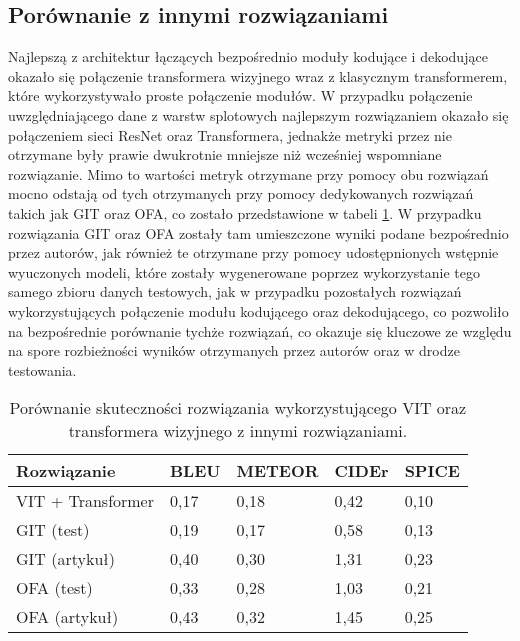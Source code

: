 \subsection{Porównanie z innymi rozwiązaniami}
Najlepszą z architektur łączących bezpośrednio moduły kodujące i dekodujące okazało się połączenie transformera wizyjnego wraz z klasycznym transformerem, które wykorzystywało proste połączenie modułów. W przypadku połączenie uwzględniającego dane z warstw splotowych najlepszym rozwiązaniem okazało się połączeniem sieci ResNet oraz Transformera, jednakże metryki przez nie otrzymane były prawie dwukrotnie mniejsze niż wcześniej wspomniane rozwiązanie. Mimo to wartości metryk otrzymane przy pomocy obu rozwiązań mocno odstają od tych otrzymanych przy pomocy dedykowanych rozwiązań takich jak GIT oraz OFA, co zostało przedstawione w tabeli \ref{tab:comparison}. W przypadku rozwiązania GIT oraz OFA zostały tam umieszczone wyniki podane bezpośrednio przez autorów, jak również te otrzymane przy pomocy udostępnionych wstępnie wyuczonych modeli, które zostały wygenerowane poprzez wykorzystanie tego samego zbioru danych testowych, jak w przypadku pozostałych rozwiązań wykorzystujących połączenie modułu kodującego oraz dekodującego, co pozwoliło na bezpośrednie porównanie tychże rozwiązań, co okazuje się kluczowe ze względu na spore rozbieżności wyników otrzymanych przez autorów oraz w drodze testowania.
\begin{table}[H]
    \centering
    \caption{Porównanie skuteczności rozwiązania wykorzystującego VIT oraz transformera wizyjnego z innymi rozwiązaniami.}
    \label{tab:comparison}
    \begin{tabular}{|l|l|l|l|l|}
        \hline
        \textbf{Rozwiązanie} & \textbf{BLEU} & \textbf{METEOR} & \textbf{CIDEr} & \textbf{SPICE} \\ \hline
        VIT + Transformer    & 0,17          & 0,18            & 0,42           & 0,10           \\ \hline
        GIT (test)           & 0,19          & 0,17            & 0,58           & 0,13           \\ \hline
        GIT (artykuł)        & 0,40          & 0,30            & 1,31           & 0,23           \\ \hline
        OFA (test)           & 0,33          & 0,28            & 1,03           & 0,21           \\ \hline
        OFA  (artykuł)       & 0,43          & 0,32            & 1,45           & 0,25           \\ \hline
    \end{tabular}
\end{table}
